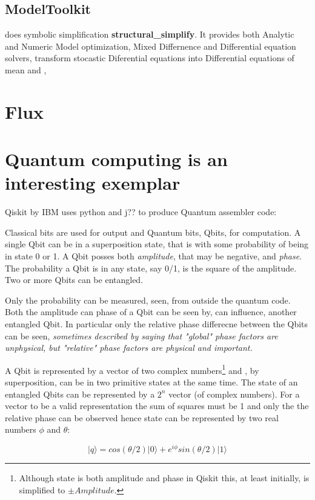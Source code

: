 \subsection{ModelToolkit}
 does symbolic simplification \- {\bf structural\_simplify}. It provides both Analytic and Numeric Model optimization, Mixed Differnence and Differential equation solvers, transform stocastic Diferential equations into Differential equations of mean and ,



\section{Flux}

\section{Quantum computing is an interesting exemplar}\label{sec:intro}
Qiskit  by IBM uses python and j?? to produce Quantum assembler code:

Classical bits are used for output and Quantum bits, Qbits, for computation.
A single Qbit can be in a superposition state, that is with some probability of being in state 0 or 1.  A Qbit posses both \emph{amplitude}, that may be negative, and \emph{phase}. The probability a Qbit is in any state, say 0/1, is the square of the amplitude. Two or more Qbits can be entangled.

Only the probability can be measured, seen, from outside the quantum code. Both the amplitude can phase of a Qbit can be seen by, can influence, another  entangled Qbit. In particular only the relative phase differecne between the Qbits can be seen, \emph{sometimes described by saying that "global" phase factors are unphysical, but "relative" phase factors are physical and important.}

A Qbit is represented by a vector of two complex numbers\footnote{Although state is both amplitude and phase  in Qiskit this, at least initially, is simplified to $\pm Amplitude$.} and , by superposition, can be in two primitive states at the same time.  The state of  an entangled Qbits can be represented by a  $2^n$ vector (of complex numbers).  For a vector to be a valid representation the sum of squares must be 1 and only the the relative phase can be observed hence state can be represented by two real numbers $\phi$ and $\theta$:

\[ |q⟩= cos(\theta/2) |0⟩ + e^{i\phi} sin(\theta/2) |1⟩ \]

